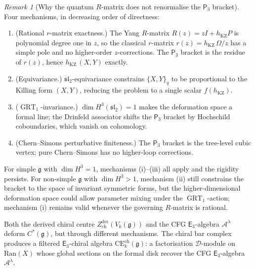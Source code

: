 \documentclass[11pt,reqno]{amsart}
\theoremstyle{definition}
\theoremstyle{remark}
\newtheorem{remark}[theorem]{Remark}
\newcommand{\cA}{\mathcal{A}}
\newcommand{\cD}{\mathcal{D}}
\newcommand{\Ran}{\mathrm{Ran}}
\newcommand{\CE}{\mathrm{CE}}
\newcommand{\Ethree}{\mathsf{E}_{3}}
\newcommand{\Pthree}{\mathsf{P}_{3}}
\DeclareMathOperator{\GRT}{GRT}
\newcommand{\fg}{\mathfrak{g}}
\numberwithin{equation}{section}
\begin{document}
\begin{remark}[Why the quantum $R$-matrix does not
renormalise the $\Pthree$ bracket]
\label{rem:ek-why-no-renorm}
Four mechanisms, in decreasing order of directness:
\begin{enumerate}[label=\textup{(\roman*)}]
\item
  \textup{(Rational $r$-matrix exactness.)}
  The Yang $R$-matrix $R(z) = zI + h_{\mathrm{KZ}} P$ is polynomial
  degree one in $z$, so the classical $r$-matrix
  $r(z) = h_{\mathrm{KZ}}\,\Omega/z$ has a simple pole and no
  higher-order $z$-corrections. The $\Pthree$ bracket is the
  residue of $r(z)$, hence $h_{\mathrm{KZ}}\,(X,Y)$ exactly.
\item
  \textup{(Equivariance.)}
  $\mathfrak{sl}_2$-equivariance constrains
  $\{X,Y\}_q$ to be proportional to the Killing form $(X,Y)$,
  reducing the problem to a single scalar $f(h_{\mathrm{KZ}})$.
\item
  \textup{($\GRT_1$-invariance.)}
  $\dim H^3(\mathfrak{sl}_2) = 1$ makes the deformation
  space a formal line; the Drinfeld associator shifts the
  $\Pthree$ bracket by Hochschild coboundaries, which
  vanish on cohomology.
\item
  \textup{(Chern--Simons perturbative finiteness.)}
  The $\Pthree$ bracket is the tree-level cubic vertex;
  pure Chern--Simons has no higher-loop corrections.
\end{enumerate}
For simple $\fg$ with $\dim H^3 = 1$, mechanisms
(i)--(iii) all apply and the rigidity persists.
For non-simple $\fg$ with
$\dim H^3 > 1$, mechanism (ii) still constrains the bracket
to the space of invariant symmetric forms, but the
higher-dimensional deformation space could allow
parameter mixing under the $\GRT_1$-action; mechanism (i)
remains valid whenever the governing $R$-matrix is rational.
\end{remark}


\label{sec:chiral-e3-algebra}

Both the derived chiral centre
$Z^{\mathrm{der}}_{\mathrm{ch}}(V_k(\fg))$ and the CFG
$\Ethree$-algebra $\cA^\lambda$ deform $C^*(\fg)$, but through
different mechanisms. The chiral bar complex produces a
filtered $\Ethree$-chiral algebra
$\CE^{\mathrm{ch}}_k(\fg)$: a factorisation $\cD$-module on
$\Ran(X)$ whose global sections on the formal disk recover
the CFG $\Ethree$-algebra $\cA^\lambda$.


\end{document}
